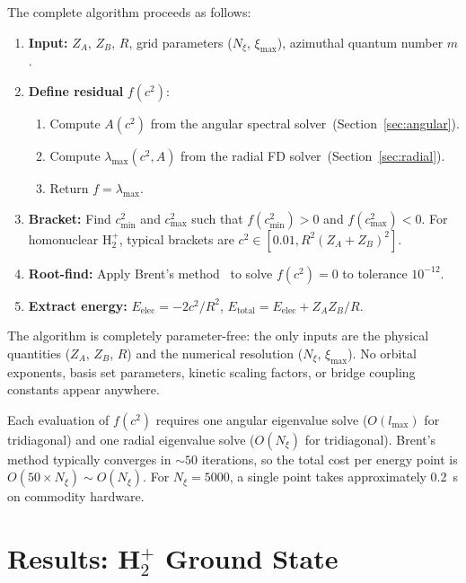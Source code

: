 \documentclass[aps,pra,twocolumn,superscriptaddress,longbibliography]{revtex4-2}
\begin{document}
The complete algorithm proceeds as follows:

\begin{enumerate}
  \item \textbf{Input:} $Z_A$, $Z_B$, $R$, grid parameters
        ($N_\xi$, $\xi_{\max}$), azimuthal quantum number $m$.
  \item \textbf{Define residual} $f(c^2)$:
    \begin{enumerate}
      \item Compute $A(c^2)$ from the angular spectral
            solver~(Section~\ref{sec:angular}).
      \item Compute $\lambda_{\max}(c^2, A)$ from the radial FD
            solver~(Section~\ref{sec:radial}).
      \item Return $f = \lambda_{\max}$.
    \end{enumerate}
  \item \textbf{Bracket:} Find $c^2_{\min}$ and $c^2_{\max}$ such
        that $f(c^2_{\min}) > 0$ and $f(c^2_{\max}) < 0$.  For
        homonuclear H$_2^+$, typical brackets are $c^2 \in
        [0.01, R^2(Z_A + Z_B)^2]$.
  \item \textbf{Root-find:} Apply Brent's method~\cite{Brent1973}
        to solve $f(c^2) = 0$ to tolerance $10^{-12}$.
  \item \textbf{Extract energy:}
        $E_{\mathrm{elec}} = -2c^2/R^2$, \quad
        $E_{\mathrm{total}} = E_{\mathrm{elec}} + Z_A Z_B / R$.
\end{enumerate}

The algorithm is completely parameter-free: the only inputs are the
physical quantities ($Z_A$, $Z_B$, $R$) and the numerical resolution
($N_\xi$, $\xi_{\max}$).  No orbital exponents, basis set parameters,
kinetic scaling factors, or bridge coupling constants appear anywhere.

Each evaluation of $f(c^2)$ requires one angular eigenvalue solve
($O(l_{\max})$ for tridiagonal) and one radial eigenvalue solve
($O(N_\xi)$ for tridiagonal).  Brent's method typically converges in
$\sim 50$ iterations, so the total cost per energy point is
$O(50 \times N_\xi) \sim O(N_\xi)$.  For $N_\xi = 5000$, a single
point takes approximately 0.2~s on commodity hardware.


\section{Results: \texorpdfstring{H$_2^+$}{H2+} Ground State}
\label{sec:results}
\end{document}
